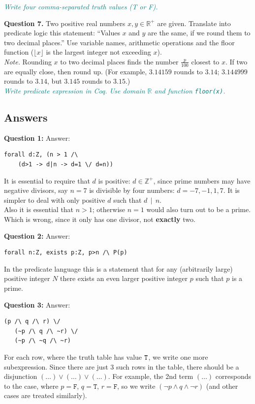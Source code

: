 \documentclass[jou]{apa6}
\begin{document}
\textcolor{teal}{\em Write four comma-separated truth values (T or F).}


{\bf Question 7.} 
Two positive real numbers $x,y \in \mathbb{R}^{+}$ are given. 
Translate into predicate logic this statement:
``Values $x$ and $y$ are the same, if we round them to two 
decimal places.'' Use variable names, arithmetic operations and 
the floor function ($\lfloor x \rfloor$ is the largest integer not
exceeding $x$).\\
{\em Note.} Rounding $x$ to two decimal places finds the 
number $\frac{p}{100}$ closest to $x$. 
If two are equally close, then round up.
(For example, $3.14159$ rounds to $3.14$; $3.144999$ rounds to $3.14$, 
but $3.145$ rounds to $3.15$.)\\
\textcolor{teal}{\em Write predicate expression in Coq. Use domain $\mathbb{R}$ and 
function {\tt floor(x)}.}









\newpage

\subsection{Answers}

{\bf Question 1:} Answer:
\begin{verbatim}
forall d:Z, (n > 1 /\ 
    (d>1 -> d|n -> d=1 \/ d=n))
\end{verbatim}
It is essential to require that $d$ is positive: $d \in \mathbb{Z}^{+}$, since prime numbers
may have negative divisors, say $n=7$ is divisible by four numbers: $d=-7, -1, 1, 7$. It is 
simpler to deal with only positive $d$ such that $d\,\mid\,n$.\\
Also it is essential that $n>1$; otherwise $n=1$ would also turn out to be a prime. Which is wrong, since it 
only has one divisor, not {\bf exactly} two.

\vspace{10pt}
{\bf Question 2:} Answer:
\begin{verbatim}
forall n:Z, exists p:Z, p>n /\ P(p)
\end{verbatim}
In the predicate language this is a statement that for any (arbitrarily large) positive integer $N$ 
there exists an even larger positive integer $p$ such that $p$ is a prime. 

\vspace{10pt}
{\bf Question 3:} Answer:
\begin{verbatim}
(p /\ q /\ r) \/ 
   (~p /\ q /\ ~r) \/ 
   (~p /\ ~q /\ ~r)
\end{verbatim}
For each row, where the truth table has value ${\tt T}$, we write one more
subexpression. Since there are just $3$ such rows in the table, 
there should be a disjunction $(\ldots) \vee (\ldots) \vee (\ldots)$. 
For example, the 2nd term $(\ldots)$ corresponds to the case, where $p = \mathtt{F}$, 
$q = \mathtt{T}$, $r = \mathtt{F}$, so we write $(\neg p \wedge q \wedge \neg r)$ (and other cases
are treated similarly).
\end{document}
